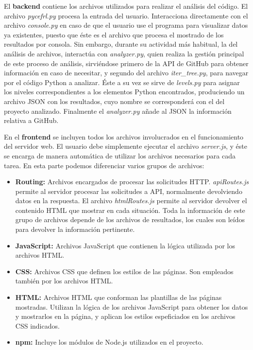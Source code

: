 \documentclass[a4paper, 12pt]{book}
\begin{document}
El \textbf{backend} contiene los archivos utilizados para realizar el análisis del código. El archivo \textit{pycefrl.py} procesa la entrada del usuario. Interacciona directamente con el archivo \textit{console.py} en caso de que el usuario use el programa para visualizar datos ya existentes, puesto que éste es el archivo que procesa el mostrado de los resultados por consola. Sin embargo, durante su actividad más habitual, la del análisis de archivos, interactúa con \textit{analyzer.py}, quien realiza la gestión principal de este proceso de análisis, sirviéndose primero de la API de GitHub para obtener información en caso de necesitar, y segundo del archivo \textit{iter\_tree.py}, para navegar por el código Python a analizar. Éste a su vez se sirve de \textit{levels.py} para asignar los niveles correspondientes a los elementos Python encontrados, produciendo un archivo JSON con los resultados, cuyo nombre se corresponderá con el del proyecto analizado. Finalmente el \textit{analyzer.py} añade al JSON la información relativa a GitHub. 

En el \textbf{frontend} se incluyen todos los archivos involucrados en el funcionamiento del servidor web. El usuario debe simplemente ejecutar el archivo \textit{server.js}, y éste se encarga de manera automática de utilizar los archivos necesarios para cada tarea. En esta parte podemos diferenciar varios grupos de archivos:

\begin{itemize}
    \item \textbf{Routing:} Archivos encargados de procesar las solicitudes HTTP. \textit{apiRoutes.js} permite al servidor procesar las solicitudes a API, normalmente devolviendo datos en la respuesta. El archivo \textit{htmlRoutes.js} permite al servidor devolver el contenido HTML que mostrar en cada situación. Toda la información de este grupo de archivos depende de los archivos de resultados, los cuales son leídos para devolver la información pertinente.

    \item \textbf{JavaScript:} Archivos JavaScript que contienen la lógica utilizada por los archivos HTML.

    \item \textbf{CSS:} Archivos CSS que definen los estilos de las páginas. Son empleados también por los archivos HTML.
    
    \item \textbf{HTML:} Archivos HTML que conforman las plantillas de las páginas mostradas. Utilizan la lógica de los archivos JavaScript para obtener los datos y mostrarlos en la página, y aplican los estilos espeficiados en los archivos CSS indicados.

    \item \textbf{npm:} Incluye los módulos de Node.js utilizados en el proyecto.
\end{itemize}
\end{document}
